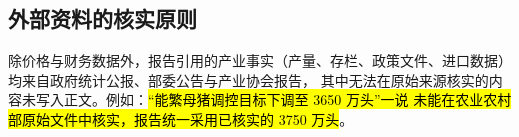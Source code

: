 \subsection{外部资料的核实原则}

除价格与财务数据外，报告引用的产业事实（产量、存栏、政策文件、进口数据）
均来自政府统计公报、部委公告与产业协会报告，
其中无法在原始来源核实的内容未写入正文。例如：\hl{“能繁母猪调控目标下调至 3650 万头”一说
未能在农业农村部原始文件中核实，报告统一采用已核实的 3750 万头}。
